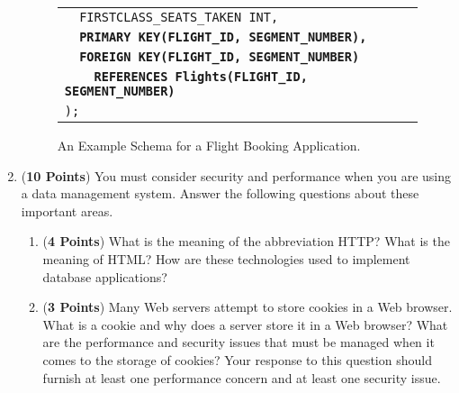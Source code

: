 \documentclass[12pt]{article}
\begin{document}
\begin{enumerate}
\begin{figure}[hp]
\begin{tabular}{l}
                  \texttt{~~FIRSTCLASS\_SEATS\_TAKEN~INT,}                              \\
                  \texttt{~~\textbf{PRIMARY KEY(FLIGHT\_ID, SEGMENT\_NUMBER),}}         \\
                  \texttt{~~\textbf{FOREIGN KEY(FLIGHT\_ID, SEGMENT\_NUMBER)}}          \\
                  \texttt{~~~~\textbf{REFERENCES Flights(FLIGHT\_ID, SEGMENT\_NUMBER)}} \\
                  \texttt{);}                                                           \\
                \end{tabular}
                \caption{\label{fig:motivating-example}An Example Schema for a Flight Booking Application.}
                \vspace{-2em}
              \end{figure}

              \newpage

            \item ({\bf 10 Points}) You must consider security and performance
              when you are using a data management system.  Answer the following
              questions about these important areas.

              \begin{enumerate}

                \item ({\bf 4 Points}) What is the meaning of the abbreviation
                  HTTP?  What is the meaning of HTML? How are these technologies
                  used to implement database applications?


                  \item ({\bf 3 Points}) Many Web servers attempt to store cookies
                    in a Web browser.  What is a cookie and why does a server store
                    it in a Web browser?  What are the performance and security
                    issues that must be managed when it comes to the storage of
                    cookies?  Your response to this question should furnish at least
                    one performance concern and at least one security issue.


\end{enumerate}
\end{enumerate}
\end{document}
